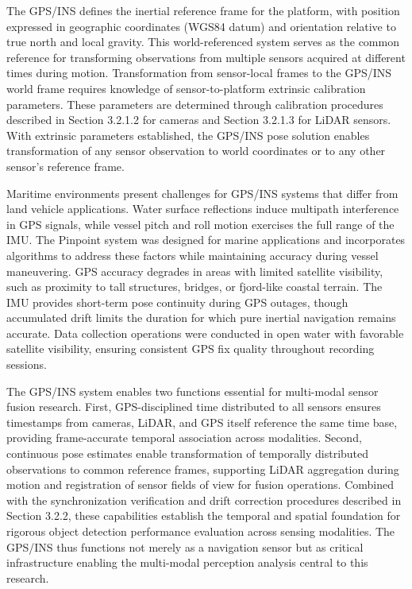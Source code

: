 \documentclass{erauthesis}
\begin{document}
The \ac{GPS}/\ac{INS} defines the inertial reference frame for the platform, with position expressed in geographic coordinates (WGS84 datum) and orientation relative to true north and local gravity.
This world-referenced system serves as the common reference for transforming observations from multiple sensors acquired at different times during motion.
Transformation from sensor-local frames to the \ac{GPS}/\ac{INS} world frame requires knowledge of sensor-to-platform extrinsic calibration parameters.
These parameters are determined through calibration procedures described in Section 3.2.1.2 for cameras and Section 3.2.1.3 for \ac{LiDAR} sensors.
With extrinsic parameters established, the \ac{GPS}/\ac{INS} pose solution enables transformation of any sensor observation to world coordinates or to any other sensor's reference frame.

Maritime environments present challenges for \ac{GPS}/\ac{INS} systems that differ from land vehicle applications.
Water surface reflections induce multipath interference in \ac{GPS} signals, while vessel pitch and roll motion exercises the full range of the \ac{IMU}.
The Pinpoint system was designed for marine applications and incorporates algorithms to address these factors while maintaining accuracy during vessel maneuvering.
\ac{GPS} accuracy degrades in areas with limited satellite visibility, such as proximity to tall structures, bridges, or fjord-like coastal terrain.
The \ac{IMU} provides short-term pose continuity during \ac{GPS} outages, though accumulated drift limits the duration for which pure inertial navigation remains accurate.
Data collection operations were conducted in open water with favorable satellite visibility, ensuring consistent \ac{GPS} fix quality throughout recording sessions.

The \ac{GPS}/\ac{INS} system enables two functions essential for multi-modal sensor fusion research.
First, \ac{GPS}-disciplined time distributed to all sensors ensures timestamps from cameras, \ac{LiDAR}, and \ac{GPS} itself reference the same time base, providing frame-accurate temporal association across modalities.
Second, continuous pose estimates enable transformation of temporally distributed observations to common reference frames, supporting \ac{LiDAR} aggregation during motion and registration of sensor fields of view for fusion operations.
Combined with the synchronization verification and drift correction procedures described in Section 3.2.2, these capabilities establish the temporal and spatial foundation for rigorous object detection performance evaluation across sensing modalities.
The \ac{GPS}/\ac{INS} thus functions not merely as a navigation sensor but as critical infrastructure enabling the multi-modal perception analysis central to this research.
\end{document}
